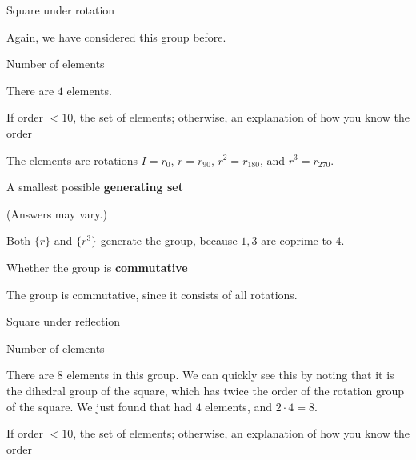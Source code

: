 \documentclass[../gatm_answers.tex]{subfiles}
\begin{document}
\begin{outer_problem}
\item Square under rotation
\end{outer_problem}

Again, we have considered this group before.

\begin{inner_problem}[start=1]
\item Number of elements
\end{inner_problem}

There are $4$ elements.

\begin{inner_problem}
\item If order $< 10$, the set of elements; otherwise, an explanation of how you know the order
\end{inner_problem}

The elements are rotations $I=r_0$, $r=r_{90}$, $r^2=r_{180}$, and $r^3=r_{270}$.

\begin{inner_problem}
\item A smallest possible \textbf{generating set}
\end{inner_problem}

(Answers may vary.)

Both $\{r\}$ and $\{r^3\}$ generate the group, because $1,3$ are coprime to $4$.

\begin{inner_problem}
\item Whether the group is \textbf{commutative}
\end{inner_problem}

The group is commutative, since it consists of all rotations.

\begin{outer_problem}
\item Square under reflection
\end{outer_problem}

\begin{inner_problem}[start=1]
\item Number of elements
\end{inner_problem}

There are $8$ elements in this group. We can quickly see this by noting that it is the dihedral group of the square, which has twice the order of the rotation group of the square. We just found that had $4$ elements, and $2\cdot 4=8$.

\begin{inner_problem}
\item If order $< 10$, the set of elements; otherwise, an explanation of how you know the order
\end{inner_problem}
\end{document}
